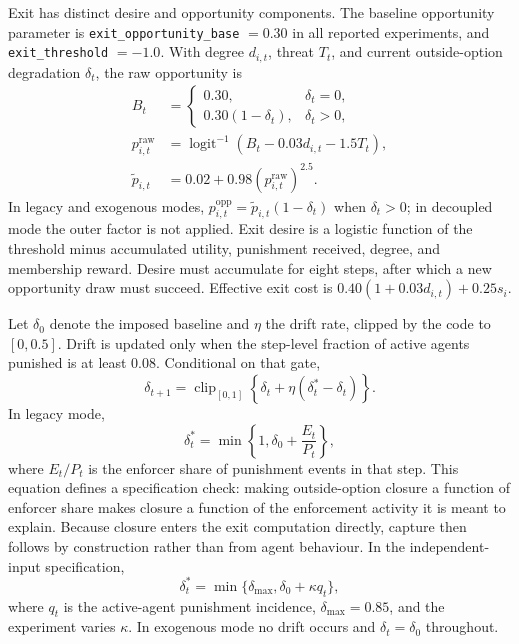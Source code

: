 \documentclass[12pt]{article}
\begin{document}
Exit has distinct desire and opportunity components. The baseline opportunity parameter is \texttt{exit\_opportunity\_base} \(=0.30\) in all reported experiments, and \texttt{exit\_threshold} \(=-1.0\). With degree \(d_{i,t}\), threat \(T_t\), and current outside-option degradation \(\delta_t\), the raw opportunity is
\begin{align}
 B_t&=\begin{cases}0.30,&\delta_t=0,\\0.30(1-\delta_t),&\delta_t>0,\end{cases}\\
 p^{\mathrm{raw}}_{i,t}&=\operatorname{logit}^{-1}(B_t-0.03d_{i,t}-1.5T_t),\\
 \widetilde p_{i,t}&=0.02+0.98\left(p^{\mathrm{raw}}_{i,t}\right)^{2.5}.
\end{align}
In legacy and exogenous modes, \(p^{\mathrm{opp}}_{i,t}=\widetilde p_{i,t}(1-\delta_t)\) when \(\delta_t>0\); in decoupled mode the outer factor is not applied. Exit desire is a logistic function of the threshold minus accumulated utility, punishment received, degree, and membership reward. Desire must accumulate for eight steps, after which a new opportunity draw must succeed. Effective exit cost is \(0.40(1+0.03d_{i,t})+0.25s_i\).

Let \(\delta_0\) denote the imposed baseline and \(\eta\) the drift rate, clipped by the code to \([0,0.5]\). Drift is updated only when the step-level fraction of active agents punished is at least 0.08. Conditional on that gate,
\begin{equation}
 \delta_{t+1}=\operatorname{clip}_{[0,1]}\left\{\delta_t+\eta(\delta_t^{*}-\delta_t)\right\}.
\end{equation}
In legacy mode,
\begin{equation}
 \delta_t^{*}=\min\left\{1,\delta_0+\frac{E_t}{P_t}\right\},
\end{equation}
where \(E_t/P_t\) is the enforcer share of punishment events in that step. This equation defines a specification check: making outside-option closure a function of enforcer share makes closure a function of the enforcement activity it is meant to explain. Because closure enters the exit computation directly, capture then follows by construction rather than from agent behaviour. In the independent-input specification,
\begin{equation}
 \delta_t^{*}=\min\{\delta_{\max},\delta_0+\kappa q_t\},
\end{equation}
where \(q_t\) is the active-agent punishment incidence, \(\delta_{\max}=0.85\), and the experiment varies \(\kappa\). In exogenous mode no drift occurs and \(\delta_t=\delta_0\) throughout.
\end{document}
